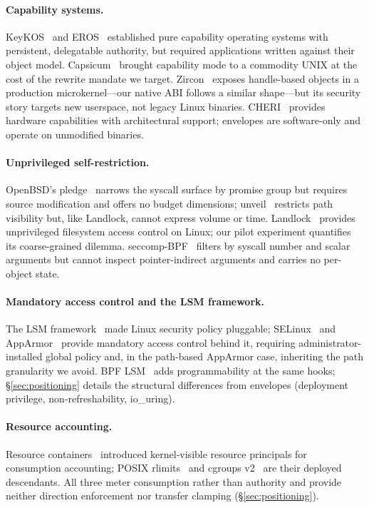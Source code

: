 \documentclass[letterpaper,twocolumn,10pt]{article}
\begin{document}
\paragraph{Capability systems.}
KeyKOS~\cite{hardy1985keykos} and EROS~\cite{shapiro1999eros}
established pure capability operating systems with persistent,
delegatable authority, but required applications written against their
object model.  Capsicum~\cite{watson2010capsicum} brought capability
mode to a commodity UNIX at the cost of the rewrite mandate we target.
Zircon~\cite{zircon2023} exposes handle-based objects in a production
microkernel---our native ABI follows a similar shape---but its security
story targets new userspace, not legacy Linux binaries.
CHERI~\cite{woodruff2014cheri} provides hardware capabilities with
architectural support; envelopes are software-only and operate on
unmodified binaries.

\paragraph{Unprivileged self-restriction.}
OpenBSD's pledge~\cite{pledge2} narrows the syscall surface by promise
group but requires source modification and offers no budget dimensions;
unveil~\cite{unveil2} restricts path visibility but, like Landlock,
cannot express volume or time.
Landlock~\cite{landlock2023} provides unprivileged filesystem access
control on Linux; our pilot experiment quantifies its coarse-grained
dilemma.  seccomp-BPF~\cite{seccomp2012} filters by syscall number and
scalar arguments but cannot inspect pointer-indirect arguments and
carries no per-object state.

\paragraph{Mandatory access control and the LSM framework.}
The LSM framework~\cite{wright2002lsm} made Linux security policy
pluggable; SELinux~\cite{loscocco2001selinux} and
AppArmor~\cite{cowan2000subdomain} provide mandatory access control
behind it, requiring administrator-installed global policy and, in the
path-based AppArmor case, inheriting the path granularity we avoid.
BPF LSM~\cite{krsi2019} adds programmability at the same hooks;
\S\ref{sec:positioning} details the structural differences from
envelopes (deployment privilege, non-refreshability, io\_uring).

\paragraph{Resource accounting.}
Resource containers~\cite{banga1999rc} introduced kernel-visible
resource principals for consumption accounting; POSIX
rlimits~\cite{setrlimit2017} and cgroups v2~\cite{cgroupsv2} are their
deployed descendants.  All three meter consumption rather than
authority and provide neither direction enforcement nor transfer
clamping (\S\ref{sec:positioning}).
\end{document}
